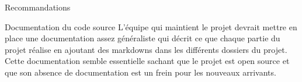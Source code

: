 \documentclass[]{article}
\begin{document}
{\begin{section}{Recommandations}
 \begin{subsection}{Documentation du code source}
     L'équipe qui maintient le projet devrait mettre en place une documentation assez généraliste qui décrit ce que chaque partie du projet réalise en ajoutant des markdowns dans les différents dossiers du projet. Cette documentation semble essentielle sachant que le projet est open source et que son absence de documentation est un frein pour les nouveaux arrivants.
 \end{subsection}
\end{section}

}
\end{document}

